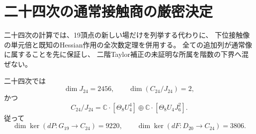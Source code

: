 

\section{二十四次の通常接触商の厳密決定}
\label{sec:v17-contact-rank}

二十四次の計算では、19頂点の新しい場だけを列挙する代わりに、
下位接触像の単元倍と既知のHessian作用の全次数定理を併用する。
全ての追加列が通常像に属することを先に保証し、
二階Taylor補正の未証明な所属を階数の下界へ混ぜない。

\begin{proposition}[二十四次の通常像と二次元商]
\label{prop:v17-ordinary-contact-rank24}
二十四次では
\[
 \dim J_{24}=2456,\qquad
 \dim(C_{24}/J_{24})=2,
\]
かつ
\[
 C_{24}/J_{24}
 =\mathbb C\cdot[\Theta_8U_4^4]
   \oplus\mathbb C\cdot[\Theta_8U_4J_6^2].
\]
従って
\[
 \dim\ker(dP:G_{19}\to C_{24})=9220,\qquad
 \dim\ker(dF:D_{20}\to C_{24})=3806.
\]
\end{proposition}


